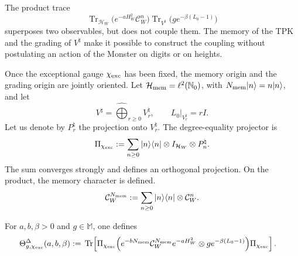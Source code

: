 The product trace
\[
 \operatorname{Tr}_{\mathcal H_W}
 \bigl(e^{-aH_W^2}\mathcal C_W^n\bigr)
 \operatorname{Tr}_{V^\natural}
 \bigl(g e^{-\beta(L_0-1)}\bigr)
\]
superposes two observables, but does not couple them. The memory of the TPK and the
grading of \(V^\natural\) make it possible to construct the coupling without postulating
an action of the Monster on digits or on heights.

Once the exceptional gauge \(\chi_{\rm exc}\) has been fixed, the memory origin and the grading origin are jointly oriented. Let
\(\mathcal H_{\rm mem}=\ell^2(\mathbb N_0)\), with
\(N_{\rm mem}|n\rangle=n|n\rangle\), and let
\[
 V^\natural=\widehat\bigoplus_{r\ge0}V^\natural_r,
 \qquad L_0|_{V^\natural_r}=rI.
\]
Let us denote by \(P_r^\natural\) the projection onto
\(V^\natural_r\). The degree-equality projector is
\begin{equation}
 \Pi_{\chi_{\rm exc}}
 :=\sum_{n\ge0}|n\rangle\langle n|
 \otimes I_{\mathcal H_W}\otimes P_n^\natural.
 \label{eq:cpe-proyector-diagonal-grados}
\end{equation}
The sum converges strongly and defines an orthogonal projection. On the product, the memory character is defined.
\begin{equation}
 \mathcal C_W^{N_{\rm mem}}
 :=\sum_{n\ge0}|n\rangle\langle n|
 \otimes\mathcal C_W^n.
 \label{eq:cpe-cayley-memoria}
\end{equation}

\begin{definition}
\label{def:cpe-traza-diagonal}
For \(a,b,\beta>0\) and \(g\in\mathbb M\), one defines
\begin{equation}
\begin{aligned}
 \Theta^{\Delta}_{g,\chi_{\rm exc}}(a,b,\beta)
 :={}&\operatorname{Tr}\!\left[
 \Pi_{\chi_{\rm exc}}
 \Bigl(
 e^{-bN_{\rm mem}}
 \mathcal C_W^{N_{\rm mem}}e^{-aH_W^2}
 \otimes g e^{-\beta(L_0-1)}
 \Bigr)
 \Pi_{\chi_{\rm exc}}
 \right].
 \label{eq:cpe-traza-diagonal-def}
\end{aligned}
\end{equation}
\end{definition}

